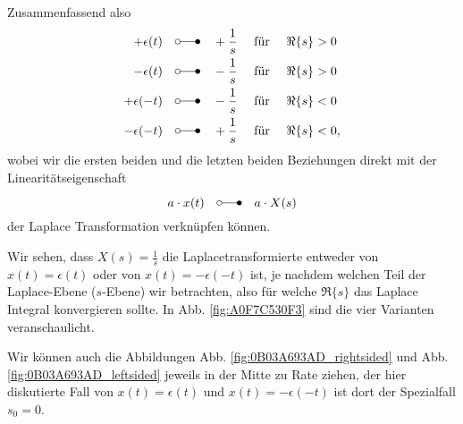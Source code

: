 \documentclass[11pt,a4paper,DIV=12]{scrartcl}
\numberwithin{equation}{section}
\numberwithin{figure}{section}
\newcommand{\fig}[1]{Abb. \ref{#1}} %
\begin{document}
\begin{Loesung}
%
Zusammenfassend also
\begin{align}
+\epsilon(t) \quad &\laplace \quad +\frac{1}{s} \quad\text{ für } \quad\Re\{s\} > 0\\
-\epsilon(t) \quad &\laplace \quad -\frac{1}{s} \quad\text{ für } \quad\Re\{s\} > 0\\
+\epsilon(-t) \quad &\laplace \quad -\frac{1}{s} \quad\text{ für }\quad \Re\{s\} < 0\\
-\epsilon(-t) \quad &\laplace \quad +\frac{1}{s} \quad\text{ für }\quad \Re\{s\} < 0,
\end{align}
wobei wir die ersten beiden und die letzten beiden Beziehungen
direkt mit der Linearitätseigenschaft
\begin{equation}
a \cdot x(t) \quad \laplace \quad a \cdot X(s)
\end{equation}
der Laplace Transformation
verknüpfen können.

Wir sehen, dass
$X(s)=\frac{1}{s}$ die Laplacetransformierte entweder von $x(t) = \epsilon(t)$
oder von $x(t)=-\epsilon(-t)$ ist, je nachdem welchen Teil der Laplace-Ebene ($s$-Ebene)
wir betrachten, also für welche $\Re\{s\}$ das Laplace Integral konvergieren sollte.
%
In \fig{fig:A0F7C530F3} sind die vier Varianten veranschaulicht.

Wir können auch die Abbildungen \fig{fig:0B03A693AD_rightsided} und
\fig{fig:0B03A693AD_leftsided} jeweils in der Mitte zu Rate ziehen, der hier
diskutierte Fall von $x(t)=\epsilon(t)$ und $x(t)=-\epsilon(-t)$ ist dort der
Spezialfall $s_0=0$.
%
\end{Loesung}
\end{document}
